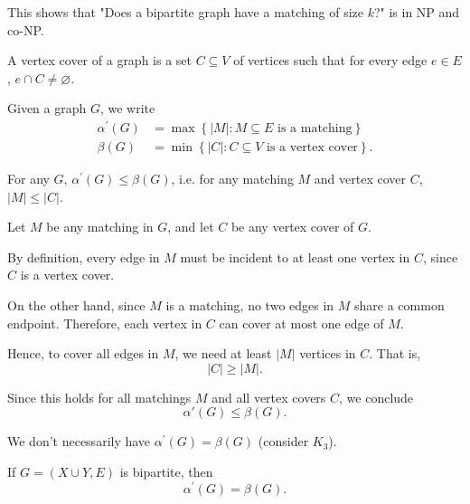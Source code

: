 \begin{remark}
    This shows that "Does a bipartite graph have a matching of size \(k\)?" is in NP and co-NP.
\end{remark}

\begin{definition}
    A vertex cover of a graph is a set \(C \subseteq V\) of vertices such that for every edge \(e \in E\), \(e \cap C \neq \varnothing\).   
\end{definition}

\begin{definition}
    Given a graph \(G\), we write 
    \begin{align*}
        \alpha ^{\prime} (G) &= \max \left\{ \vert M \vert : M \subseteq E \text{ is a matching}   \right\} \\
        \beta (G) &= \min \left\{ \vert C \vert: C \subseteq V \text{ is a vertex cover}   \right\}. 
    \end{align*}
\end{definition}

\begin{claim}
    For any \(G\), \(\alpha ^{\prime} (G) \le \beta (G)\), i.e. for any matching \(M\) and vertex cover \(C\), \(\vert M \vert \le \vert C \vert  \).     
\end{claim}

\begin{explanation}
    Let $M$ be any matching in $G$, and let $C$ be any vertex cover of $G$.

By definition, every edge in $M$ must be incident to at least one vertex in $C$, since $C$ is a vertex cover.

On the other hand, since $M$ is a matching, no two edges in $M$ share a common endpoint. Therefore, each vertex in $C$ can cover at most one edge of $M$.

Hence, to cover all edges in $M$, we need at least $|M|$ vertices in $C$. That is,
\[
    |C| \ge |M|.
\]

Since this holds for all matchings $M$ and all vertex covers $C$, we conclude
\[
    \alpha'(G) \le \beta(G).
\]
\end{explanation}

\begin{remark}
    We don't necessarily have \(\alpha ^{\prime} (G) = \beta (G)\) (consider \(K_3\)). 
\end{remark}

\begin{theorem}[Konig]
    If \(G=(X \cup  Y, E)\) is bipartite, then 
    \[
        \alpha ^{\prime} (G) = \beta (G).
    \] 
\end{theorem}

